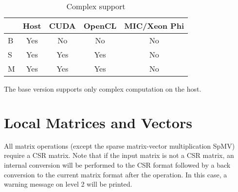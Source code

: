 \begin{table}[h]
\begin{tabular}{l|c|c|c|c|}
\multicolumn{1}{c|}{} & \multicolumn{1}{l|}{Host} & \multicolumn{1}{l|}{CUDA} & \multicolumn{1}{l|}{OpenCL} & \multicolumn{1}{l|}{MIC/Xeon Phi} \\ \hline
B                     & Yes                                & No                        & No                          & No                                     \\ \hline
S                     & Yes                                & Yes                       & Yes                         & No                                     \\ \hline
M                     & Yes                                & Yes                       & Yes                         & No                                     \\ \hline
\end{tabular}
\caption{Complex support}
\end{table}

The base version supports only complex computation on the host.

\section{Local Matrices and Vectors}

All matrix operations (except the sparse matrix-vector multiplication SpMV) require a CSR matrix. Note that if the input matrix is not a CSR matrix, an internal conversion will be performed to the CSR format followed by a back conversion to the current matrix format after the operation. In this case, a warning message on level 2 will be printed.


